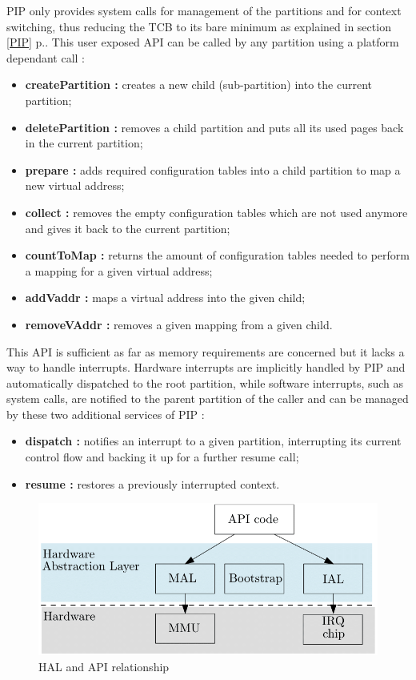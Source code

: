 \noindent PIP only provides system calls for management of the partitions and for context switching, thus reducing the TCB to its bare minimum as explained in section \ref{PIP} p.\pageref{PIP}. This user exposed API can be called by any partition using a platform dependant call :
\begin{itemize}
	\item \textbf{createPartition :} creates a new child (sub-partition) into the current partition;
	\item \textbf{deletePartition :} removes a child partition and puts all its used pages back in the current partition;
	\item \textbf{prepare :} adds required configuration tables into a child partition to map a new virtual address;
	\item \textbf{collect :} removes the empty configuration tables which are not used anymore and gives it back to the current partition; 
	\item \textbf{countToMap :} returns the amount of configuration tables needed to perform a mapping for a given virtual address;
	\item \textbf{addVaddr :} maps a virtual address into the given child;
	\item \textbf{removeVAddr :} removes a given mapping from a given child.
\end{itemize} 
This API is sufficient as far as memory requirements are concerned but it lacks a way to handle interrupts. Hardware interrupts are implicitly handled by PIP and automatically dispatched to the root partition, while software interrupts, such as system calls, are notified to the parent partition of the caller and can be managed by these two additional services of PIP :
\begin{itemize}
	\item \textbf{dispatch :} notifies an interrupt to a given partition, interrupting its current control flow and backing it up for a further resume call;
	\item \textbf{resume :} restores a previously interrupted context.
\end{itemize}
\vspace{-0.8em} 
\begin{figure}[!ht]  
	\centering 	\includegraphics[width=0.58\linewidth,frame]{img/HAL.png} 
	\caption{HAL and API relationship}
	\label{HAL}
\end{figure}

